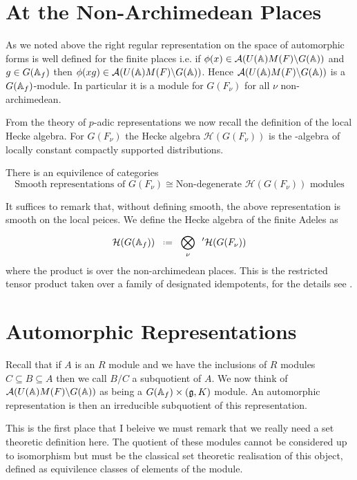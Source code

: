 \begin{Theorem}
\end{Theorem}

\section{At the Non-Archimedean Places}
As we noted above the right regular representation on the space of automorphic forms is well defined for the finite places i.e. 
if \(\phi(x)\in \mathcal{A}(U(\A)M(F)\backslash G(\A))\) and \(g\in G(\A_f)\) then \(\phi(xg) \in \mathcal{A}(U(\A)M(F)\backslash G(\A)) \). Hence \(\mathcal{A}(U(\A)M(F)\backslash G(\A))\) is a \(G(\A_f)\)-module. In particular it is a module for \(G(F_\nu)\) for all \(\nu\) non-archimedean.

From the theory of \(p\)-adic representations we now recall the definition of the local Hecke algebra. For \(G(F_\nu)\) the Hecke algebra \(\mathcal{H}(G(F_\nu))\) is the \C-algebra of locally constant compactly supported distributions. 
\begin{theorem}
    There is an equivilence of categories  
    \[\text{Smooth representations of }G(F_\nu) \cong \text{Non-degenerate }\mathcal{H}(G(F_\nu)) \text{ modules}\]
\end{theorem}
It suffices to remark that, without defining smooth, the above representation is smooth on the local peices. We define the Hecke algebra of the finite Adeles as 
\[\mathcal{H}(G(\A_f)) \defeq \bigotimes^{}_\nu \phantom{a}' \mathcal{H}(G(F_\nu))\]
where the product is over the non-archimedean places. This is the restricted tensor product taken over a family of designated idempotents, for the details see
.

\section{Automorphic Representations}
Recall that if \(A\) is an \(R\) module and we have the inclusions of \(R\) modules \(C \subseteq B \subseteq A\) then we call \(B/C\) a subquotient of \(A\). We now think of \(\mathcal{A}(U(\A)M(F)\backslash G(\A))\) as being a \(G(\A_f)\times (\mathfrak{g}, K)\) module. An automorphic representation is then an irreducible subquotient of this representation.
\begin{remark}
    This is the first place that I beleive we must remark that we really need a set theoretic definition here. The quotient of these modules cannot be considered up to isomorphism but must be the classical set theoretic realisation of this object, defined as equivilence classes of elements of the module.
\end{remark}

